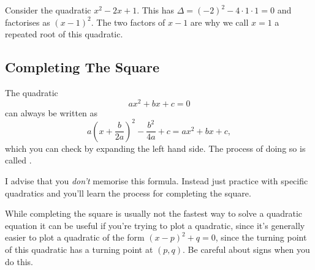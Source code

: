 \documentclass[fleqn]{LectureClass/LectureClass}
\begin{document}
    Consider the quadratic \(x^2 - 2x + 1\).
    This has \(\Delta = (-2)^2 - 4 \cdot 1 \cdot 1 = 0\) and factorises as \((x - 1)^2\).
    The two factors of \(x - 1\) are why we call \(x = 1\) a repeated root of this quadratic.
    
    \subsection{Completing The Square}
    The quadratic
    \begin{equation}
        ax^2 + bx + c = 0
    \end{equation}
    can always be written as
    \begin{equation}
        a\left( x + \frac{b}{2a} \right)^2 - \frac{b^2}{4a} + c = ax^2 + bx + c,
    \end{equation}
    which you can check by expanding the left hand side.
    The process of doing so is called .
    
    I advise that you \emph{don't} memorise this formula.
    Instead just practice with specific quadratics and you'll learn the process for completing the square.
    
    While completing the square is usually not the fastest way to solve a quadratic equation it can be useful if you're trying to plot a quadratic, since it's generally easier to plot a quadratic of the form \((x - p)^2 + q = 0\), since the turning point of this quadratic has a turning point at \((p, q)\).
    Be careful about signs when you do this.
    
\end{document}
